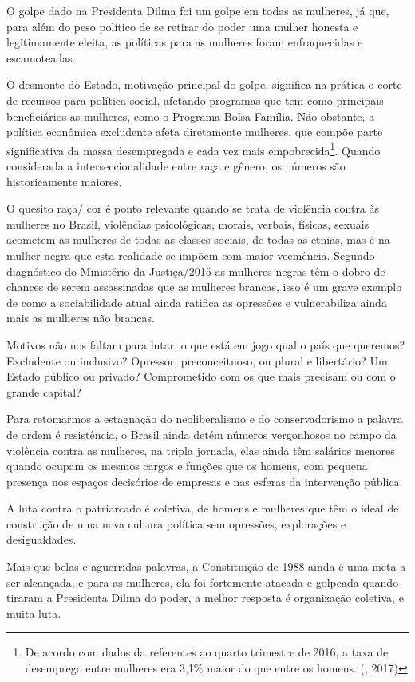O golpe dado na Presidenta Dilma foi um golpe em todas as mulheres, já
que, para além do peso político de se retirar do poder uma mulher
honesta e legitimamente eleita, as políticas para as mulheres foram
enfraquecidas e escamoteadas.

O desmonte do Estado, motivação principal do golpe, significa na prática
o corte de recursos para política social, afetando programas que tem
como principais beneficiários as mulheres, como o Programa Bolsa
Família. Não obstante, a política econômica excludente afeta diretamente
mulheres, que compõe parte significativa da massa desempregada e cada
vez mais empobrecida\footnote{De acordo com dados da  referentes
  ao quarto trimestre de 2016, a taxa de desemprego entre mulheres era
  3,1\% maior do que entre os homens. (, 2017)}. Quando considerada
a interseccionalidade entre raça e gênero, os números são historicamente
maiores.

O quesito raça/ cor é ponto relevante quando se trata de violência
contra às mulheres no Brasil, violências psicológicas, morais, verbais,
físicas, sexuais acometem as mulheres de todas as classes sociais, de
todas as etnias, mas é na mulher negra que esta realidade se impõem com
maior veemência. Segundo diagnóstico do Ministério da Justiça/2015 as
mulheres negras têm o dobro de chances de serem assassinadas que as
mulheres brancas, isso é um grave exemplo de como a sociabilidade atual
ainda ratifica as opressões e vulnerabiliza ainda mais as mulheres não
brancas.

Motivos não nos faltam para lutar, o que está em jogo qual o país que
queremos? Excludente ou inclusivo? Opressor, preconceituoso, ou plural e
libertário? Um Estado público ou privado? Comprometido com os que mais
precisam ou com o grande capital?

Para retomarmos a estagnação do neoliberalismo e do conservadorismo a
palavra de ordem é resistência, o Brasil ainda detém números vergonhosos
no campo da violência contra as mulheres, na tripla jornada, elas ainda
têm salários menores quando ocupam os mesmos cargos e funções que os
homens, com pequena presença nos espaços decisórios de empresas e nas
esferas da intervenção pública.

A luta contra o patriarcado é coletiva, de homens e mulheres que têm o
ideal de construção de uma nova cultura política sem opressões,
explorações e desigualdades.

Mais que belas e aguerridas palavras, a Constituição de 1988 ainda é uma
meta a ser alcançada, e para as mulheres, ela foi fortemente atacada e
golpeada quando tiraram a Presidenta Dilma do poder, a melhor resposta é
organização coletiva, e muita luta.

